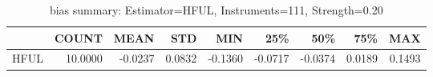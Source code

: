 \begin{table}[ht]
\centering
\caption{bias summary: Estimator=HFUL, Instruments=111, Strength=0.20}
\begin{tabular}{lrrrrrrrr}
\toprule
 & COUNT & MEAN & STD & MIN & 25\% & 50\% & 75\% & MAX \\
\midrule
HFUL & 10.0000 & -0.0237 & 0.0832 & -0.1360 & -0.0717 & -0.0374 & 0.0189 & 0.1493 \\
\bottomrule
\end{tabular}
\end{table}
